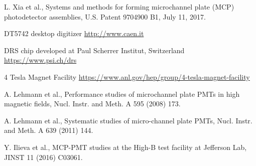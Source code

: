 \documentclass[preprint,5p]{elsarticle}
\begin{document}
\begin{thebibliography}{00}
L. Xia et al., Systems and methods for forming microchannel plate (MCP) 
photodetector assemblies, U.S. Patent 9704900 B1, July 11, 2017.

DT5742 desktop digitizer \url{http://www.caen.it}

   DRS chip developed at Paul Scherrer Institut, Switzerland \url{
https://www.psi.ch/drs}

4 Tesla Magnet Facility 
\url{https://www.anl.gov/hep/group/4-tesla-magnet-facility}

A. Lehmann et al., Performance studies of microchannel plate PMTs in high 
magnetic fields, Nucl. Instr. and Meth. A 595 (2008) 173.

A. Lehmann et al., Systematic studies of micro-channel plate PMTs, Nucl.  
Instr. and Meth. A 639 (2011) 144.

Y. Ilieva et al., MCP-PMT studies at the High-B test facility at Jefferson Lab, 
JINST 11 (2016) C03061.

\end{thebibliography}
\end{document}

